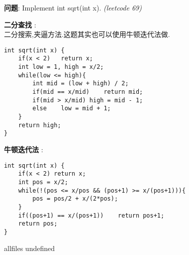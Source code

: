 \documentclass{article}
\begin{document}
\begin{CJK}{UTF8}{gbsn}     %

\else
    
\begin{description}
    \item{\textbf{问题}}: Implement int sqrt(int x). \textit{(leetcode 69)}
    \item{\textbf{二分查找}} : 
    \\二分搜索,夹逼方法.这题其实也可以使用牛顿迭代法做.
    \begin{lstlisting}
int sqrt(int x) {
	if(x < 2)	return x;
	int low = 1, high = x/2;
	while(low <= high){
		int mid = (low + high) / 2;
		if(mid == x/mid)	return mid;
		if(mid > x/mid)	high = mid - 1;
		else	low = mid + 1;
	}
	return high;
}
    \end{lstlisting}
    \item{\textbf{牛顿迭代法}} : 
    \begin{lstlisting}
int sqrt(int x) {
	if(x < 2) return x;
	int pos = x/2;
	while(!(pos <= x/pos && (pos+1) >= x/(pos+1))){
		pos = pos/2 + x/(2*pos);
	}
	if((pos+1) == x/(pos+1))	return pos+1;
	return pos;
}
    \end{lstlisting}
    \textit{}
\end{description}

\fi

\ifx allfiles undefined
\end{CJK}
\end{document}
